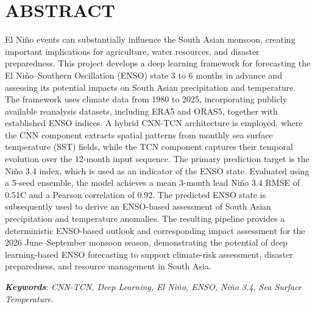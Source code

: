 \chapter*{ABSTRACT}
\bigskip

El Ni\~{n}o events can substantially influence the South Asian monsoon, creating important implications for agriculture, water resources, and disaster preparedness. This project develops a deep learning framework for forecasting the El Ni\~{n}o--Southern Oscillation (ENSO) state 3 to 6 months in advance and assessing its potential impacts on South Asian precipitation and temperature. The framework uses climate data from 1980 to 2025, incorporating publicly available reanalysis datasets, including ERA5 and ORAS5, together with established ENSO indices. A hybrid CNN-TCN architecture is employed, where the CNN component extracts spatial patterns from monthly sea surface temperature (SST) fields, while the TCN component captures their temporal evolution over the 12-month input sequence. The primary prediction target is the Ni\~{n}o 3.4 index, which is used as an indicator of the ENSO state. Evaluated using a 5-seed ensemble, the model achieves a mean 3-month lead Ni\~{n}o 3.4 RMSE of 0.51\degree C and a Pearson correlation of 0.92. The predicted ENSO state is subsequently used to derive an ENSO-based assessment of South Asian precipitation and temperature anomalies. The resulting pipeline provides a deterministic ENSO-based outlook and corresponding impact assessment for the 2026 June--September monsoon season, demonstrating the potential of deep learning-based ENSO forecasting to support climate-risk assessment, disaster preparedness, and resource management in South Asia.

\vspace{1em}
\noindent\textit{\textbf{Keywords}}: \textit{CNN-TCN, Deep Learning, El Ni\~{n}o, ENSO, Ni\~{n}o 3.4, Sea Surface Temperature}.

\clearpage